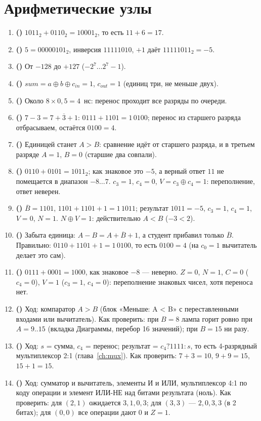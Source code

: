 \section*{Арифметические узлы}
\begin{enumerate}
  \item \textbf{()} $1011_2+0110_2=10001_2$, то есть $11+6=17$.
  \item \textbf{()} $5=00000101_2$, инверсия $11111010$, $+1$ даёт $11111011_2=-5$.
  \item \textbf{()} От $-128$ до $+127$ ($-2^7\ldots 2^7-1$).
  \item \textbf{()} $sum=a\oplus b\oplus c_{in}=1$, $c_{out}=1$ (единиц три, не меньше двух).
  \item \textbf{()} Около $8\times 0{,}5=4$~нс: перенос проходит все разряды по очереди.
  \item \textbf{()} $7-3=7+\overline{3}+1$: $0111+1101=1\,0100$; перенос из старшего разряда отбрасываем, остаётся $0100=4$.
  \item \textbf{()} Единицей станет $A>B$: сравнение идёт от старшего разряда, и в третьем разряде $A=1$, $B=0$ (старшие два совпали).
  \item \textbf{()} $0110+0101=1011_2$; как знаковое это $-5$, а верный ответ $11$ не помещается в диапазон $-8\ldots 7$. $c_3=1$, $c_4=0$, $V=c_3\oplus c_4=1$: переполнение, ответ неверен.
  \item \textbf{()} $\overline{B}=1101$, $1101+1101+1=1\,1011$; результат $1011=-5$, $c_3=1$, $c_4=1$, $V=0$, $N=1$. $N\oplus V=1$: действительно $A<B$ ($-3<2$).
  \item \textbf{()} Забыта единица: $A-B=A+\overline{B}+1$, а студент прибавил только $\overline{B}$. Правильно: $0110+1101+1=1\,0100$, то есть $0100=4$ (на $c_0=1$ вычитатель делает это сам).
  \item \textbf{()} $0111+0001=1000$, как знаковое $-8$ --- неверно. $Z=0$, $N=1$, $C=0$ ($c_4=0$), $V=1$ ($c_3=1$, $c_4=0$): переполнение знаковых чисел, хотя переноса нет.
  \item \textbf{()} Ход: компаратор $A>B$ (блок «Меньше: A < B» с переставленными входами или вычитатель). Как проверить: при $B=8$ лампа горит ровно при $A=9..15$ (вкладка Диаграммы, перебор 16 значений); при $B=15$ ни разу.
  \item \textbf{()} Ход: $s$ = сумма, $c_4$ = перенос; результат = $c_4 ? 1111 : s$, то есть 4-разрядный мультиплексор 2:1 (глава~\ref{ch:mux}). Как проверить: $7+3=10$, $9+9=15$, $15+1=15$.
  \item \textbf{()} Ход: сумматор и вычитатель, элементы И и ИЛИ, мультиплексор 4:1 по коду операции и элемент ИЛИ-НЕ над битами результата (ноль). Как проверить: для $(2,1)$ ожидается $3,1,0,3$; для $(3,3)$ --- $2,0,3,3$ (в 2 битах); для $(0,0)$ все операции дают 0 и $Z=1$.
\end{enumerate}


